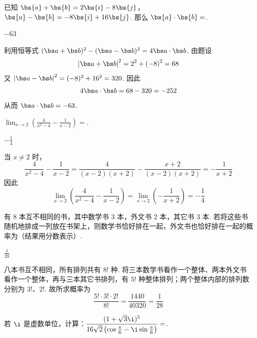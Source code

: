 \documentclass[UTF8,a4paper,oneside,11pt]{ctexbook}
\begin{document}
\setcounter{probnum}{14}
\begin{problem}[B]
已知 \(\bs{a}+\bs{b}=2\bs{i}-8\bs{j}\)，\(\bs{a}-\bs{b}=-8\bs{i}+16\bs{j}\). 那么 \(\bs{a}\cdot\bs{b}=\)\fillinblank{}.
\end{problem}

\begin{answer}
\(-63\)
\end{answer}

\begin{solution}
利用恒等式 \((\bs a+\bs b)^2-(\bs a-\bs b)^2=4\bs a\cdot\bs b\). 由题设
\[
\left\lvert\bs a+\bs b\right\rvert^2=2^2+(-8)^2=68
\]
又 \(\left\lvert\bs a-\bs b\right\rvert^2=(-8)^2+16^2=320\).
因此
\[
4\bs a\cdot\bs b=68-320=-252
\]
从而 \(\bs a\cdot\bs b=-63\).
\end{solution}

\begin{problem}[B]
\(\displaystyle\lim_{x\to2}\left(\frac{4}{x^{2}-4}-\frac{1}{x-2}\right)=\)\fillinblank{}.
\end{problem}

\begin{answer}
\(-\frac{1}{4}\)
\end{answer}

\begin{solution}
当 \(x\neq2\) 时，
\[
\frac{4}{x^2-4}-\frac{1}{x-2}
=\frac{4}{(x-2)(x+2)}-\frac{x+2}{(x-2)(x+2)}
=-\frac{1}{x+2}
\]
因此
\[
\lim_{x\to2}\left(\frac{4}{x^2-4}-\frac{1}{x-2}\right)
=\lim_{x\to2}\left(-\frac{1}{x+2}\right)=-\frac14
\]
\end{solution}

\begin{problem}[B]
有 \(8\) 本互不相同的书，其中数学书 \(3\) 本，外文书 \(2\) 本，其它书 \(3\) 本. 若将这些书随机地排成一列放在书架上，则数学书恰好排在一起，外文书也恰好排在一起的概率为\fillinblank{}（结果用分数表示）.
\end{problem}

\begin{answer}
\(\frac{1}{28}\)
\end{answer}

\begin{solution}
八本书互不相同，所有排列共有 \(8!\) 种. 将三本数学书看作一个整体、两本外文书看作一个整体，再与三本其它书排列，有 \(5!\) 种整体排列；两个整体内部的排列数分别为 \(3!\)、\(2!\). 故所求概率为
\[
\frac{5!\cdot3!\cdot2!}{8!}=\frac{1440}{40320}=\frac{1}{28}
\]
\end{solution}

\begin{problem}[B]
若 \(\i\) 是虚数单位，计算：\(\displaystyle \frac{(1+\sqrt{3}\i)^5}{16\sqrt{2}\left(\cos\frac{\pi}{6}-\i\sin\frac{\pi}{6}\right)}=\)\fillinblank{}.
\end{problem}
\end{document}
